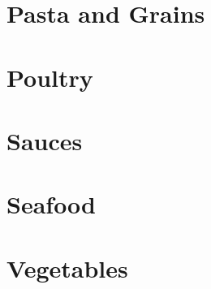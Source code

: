 \documentclass{report}
\begin{document}
    \chapter{Pasta and Grains}

    
    
    
    
    
    
    
    
    
    
    
    
    

    \chapter{Poultry}

    
    
    
    
    
    
    

    \chapter{Sauces}
    
    
    

    \chapter{Seafood}

    
    
    
    
    
    
    
    

    \chapter{Vegetables}
    
    
    
    
    
    
    
    
    
    
    
    
    
    
\end{document}
